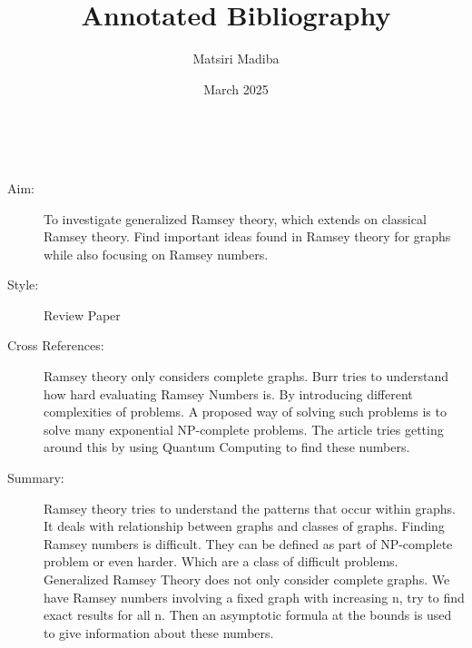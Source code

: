 \documentclass{Assignment}
\author{Matsiri Madiba}
\date{March 2025}
\title{Annotated Bibliography}
\begin{document}
\maketitle
\cite{burr1981generalized}~
\begin{description}
	\item[Aim:]
	To investigate generalized Ramsey theory, which extends on classical Ramsey theory.
	Find important ideas found in Ramsey theory for graphs while also focusing on Ramsey numbers.

\item[Style:]
Review Paper
\item[Cross References:]

Ramsey theory only considers complete graphs. 
Burr tries to understand how hard evaluating Ramsey Numbers is.
By introducing different complexities of problems.
A proposed way of solving such problems is to solve many exponential NP-complete problems.
The article \cite{PhysRevA.93.032301} tries getting around this by using Quantum Computing to find these numbers.
\item [Summary:]
Ramsey theory tries to understand the patterns that occur within graphs.
It deals with relationship between graphs and classes of graphs.
Finding Ramsey numbers is difficult.
They can be defined as part of NP-complete problem or even harder.
Which are a class of difficult problems.
Generalized Ramsey Theory does not only consider complete graphs.
We have Ramsey numbers involving a fixed graph with increasing n, try to find exact results for all n. 
Then an asymptotic formula at the bounds is used to give information about these numbers.  
\end{description}
\end{document}
